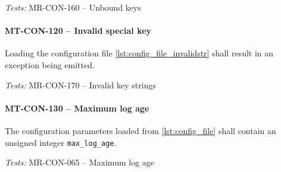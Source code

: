 \textit{Tests: } MR-CON-160 -- Unbound keys

\paragraph{MT-CON-120 -- Invalid special key}
Loading the configuration file \cref{lst:config_file_invalidstr} shall
result in an exception being emitted.

\textit{Tests: } MR-CON-170 -- Invalid key strings

\paragraph{MT-CON-130 -- Maximum log age}
The configuration parameters loaded from \cref{lst:config_file}
shall contain an unsigned integer \lstinline{max_log_age}.

\textit{Tests: } MR-CON-065 -- Maximum log age
